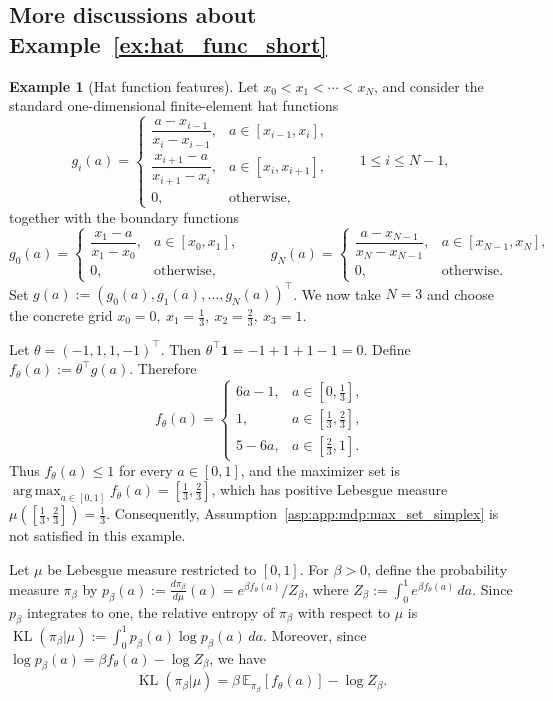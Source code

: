 \documentclass{amsart}
\theoremstyle{definition}
\newtheorem{example}{Example}
\begin{document}
\subsection{More discussions about Example~\ref{ex:hat_func_short}}
\label{sec:ex}
\begin{example}[Hat function features]\label{ex:hat_func}
Let $x_0<x_1<\cdots <x_N$, and consider the standard one-dimensional finite-element hat functions
\[
g_i(a)=
\begin{cases}
\dfrac{a-x_{i-1}}{x_i-x_{i-1}}, & a\in [x_{i-1},x_i],\\[0.8em]
\dfrac{x_{i+1}-a}{x_{i+1}-x_i}, & a\in [x_i,x_{i+1}],\\[0.8em]
0, & \text{otherwise},
\end{cases}
\qquad 1\leq i\leq N-1,
\]
together with the boundary functions
\[
g_0(a)=
\begin{cases}
\dfrac{x_1-a}{x_1-x_0}, & a\in [x_0,x_1],\\[0.8em]
0, & \text{otherwise},
\end{cases}
\qquad
g_N(a)=
\begin{cases}
\dfrac{a-x_{N-1}}{x_N-x_{N-1}}, & a\in [x_{N-1},x_N],\\[0.8em]
0, & \text{otherwise}.
\end{cases}
\]
Set $g(a):=(g_0(a),g_1(a),\dots,g_N(a))^\top$. We now take $N=3$ and choose the concrete grid $x_0=0,\ x_1=\frac13,\ x_2=\frac23,\ x_3=1$.

Let $\theta=(-1,1,1,-1)^\top$. Then $\theta^\top \mathbf 1=-1+1+1-1=0$. Define $f_\theta(a):=\theta^\top g(a)$. Therefore
\[
f_\theta(a)=
\begin{cases}
6a-1, & a\in \left[0,\frac13\right],\\[0.8em]
1, & a\in \left[\frac13,\frac23\right],\\[0.8em]
5-6a, & a\in \left[\frac23,1\right].
\end{cases}
\]
Thus $f_\theta(a)\leq 1$ for every $a\in[0,1]$, and the maximizer set is $\operatorname*{arg\,max}_{a\in[0,1]} f_\theta(a)=\left[\frac13,\frac23\right]$, which has positive Lebesgue measure $\mu([\frac13,\frac23])=\frac13$. Consequently, Assumption~\ref{asp:app:mdp:max_set_simplex} is not satisfied in this example.

Let $\mu$ be Lebesgue measure restricted to $[0,1]$. For $\beta>0$, define the probability measure $\pi_\beta$ by $p_\beta(a):=\frac{d\pi_\beta}{d\mu}(a)=e^{\beta f_\theta(a)}/Z_\beta$, where $Z_\beta:=\int_0^1 e^{\beta f_\theta(a)}\,da$. Since $p_\beta$ integrates to one, the relative entropy of $\pi_\beta$ with respect to $\mu$ is $\operatorname{KL}(\pi_\beta| \mu):=\int_0^1 p_\beta(a)\log p_\beta(a)\,da$. Moreover, since $\log p_\beta(a)=\beta f_\theta(a)-\log Z_\beta$, we have
\[
\operatorname{KL}(\pi_\beta| \mu)
=
\beta\,\mathbb E_{\pi_\beta}[f_\theta(a)]-\log Z_\beta .
\]


\end{example}
\end{document}
